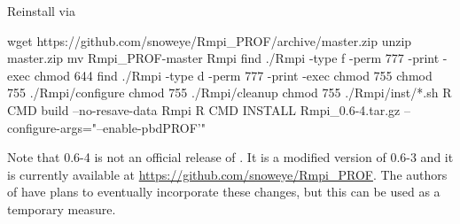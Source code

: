Reinstall  via
\begin{Command}
wget https://github.com/snoweye/Rmpi_PROF/archive/master.zip
unzip master.zip
mv Rmpi_PROF-master Rmpi
find ./Rmpi -type f -perm 777 -print -exec chmod 644 {} \;
find ./Rmpi -type d -perm 777 -print -exec chmod 755 {} \;
chmod 755 ./Rmpi/configure
chmod 755 ./Rmpi/cleanup
chmod 755 ./Rmpi/inst/*.sh
R CMD build --no-resave-data Rmpi
R CMD INSTALL Rmpi_0.6-4.tar.gz --configure-args="--enable-pbdPROF'"
\end{Command}
Note that {\color{red} 0.6-4} is not an official release of .
It is a modified version of 0.6-3 and it is currently available at
\url{https://github.com/snoweye/Rmpi_PROF}.  The authors of  have plans 
to eventually incorporate these changes, but this can be used as a temporary 
measure.
